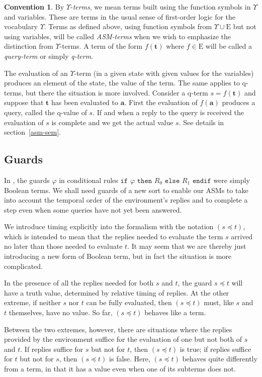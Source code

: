 \documentclass{LMCS}
\theoremstyle{definition}
\newtheorem{conn}[thm]{Convention}
\newcommand{\E}{\mathrm{E}}
\newcommand{\U}{\Upsilon}
\newcommand{\bld}[1]{\ensuremath{\mathbf {#1}}}
\newcommand{\ttt}[1]{\ensuremath{\mathtt {#1}}}
\renewcommand{\phi}{\varphi}
\begin{document}
\begin{conn}
  By $\Upsilon$-\emph{terms}, we mean terms built using the function
  symbols in $\Upsilon$ and variables.  These are terms in the usual
  sense of first-order logic for the vocabulary $\Upsilon$.  Terms as
  defined above, using function symbols from $\Upsilon\cup\E$ but not
  using variables, will be called \emph{ASM-terms} when we wish to
  emphasize the distinction from $\Upsilon$-terms.  A term of the form
  $f(\bld t)$ where $f \in \E$ will be called a \emph{query-term} or
  simply \emph{q-term}.
\end{conn}

The evaluation of an $\U$-term (in a given state with given values for
the variables) produces an element of the state, the value of the
term.  The same applies to q-terms, but there the situation is more
involved.  Consider a q-term $s = f(\bld t)$ and suppose that $\bld t$
has been evaluated to $\bld a$.  First the evaluation of $f(\bld a)$
produces a query, called the q-value of $s$.  If and when a reply to
the query is received the evaluation of $s$ is complete and we get the
actual value $s$.  See details in section~\ref{asm-sem}.

\subsection{Guards}

In \cite{oa2}, the guards $\phi$ in conditional rules \ttt{if} $\phi$
\ttt{then} $R_0$ \ttt{else} $R_1$ \ttt{endif} were simply Boolean
terms.  We shall need guards of a new sort to enable our ASMs to take
into account the temporal order of the environment's replies and to
complete a step even when some queries have not yet been answered.

We introduce timing explicitly into the formalism with the notation
$(s\preceq t)$, which is intended to mean that the replies needed to
evaluate the term $s$ arrived no later than those needed to evaluate
$t$.  It may seem that we are thereby just introducing a new
form of Boolean term, but in fact the situation is more complicated.

In the presence of
all the replies needed for both $s$ and $t$, the guard $s\preceq t$
will have a truth value, determined by relative timing of replies.
At the other extreme, if neither $s$ nor $t$ can be
fully evaluated,
then $(s\preceq t)$ must, like $s$ and
$t$ themselves, have no value.  So far, $(s\preceq t)$ behaves like
a term.

Between the two extremes, however, there are situations where
the replies provided by the environment suffice for the evaluation
of one but not both of $s$ and $t$. If replies suffice for $s$ but
not for $t$, then $(s\preceq t)$ is true; if replies suffice for $t$
but not for $s$, then $(s\preceq t)$ is false. Here, $(s\preceq t)$
behaves quite differently from a term, in that it has a value even
when one of its subterms does not.
\end{document}
